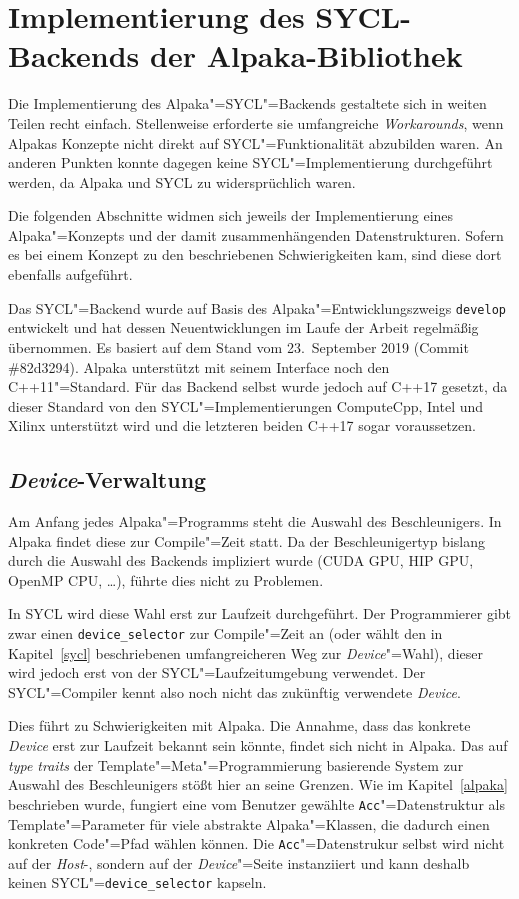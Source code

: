 \chapter{Implementierung des SYCL-Backends der Alpaka-Bibliothek}
\label{implementierung}

Die Implementierung des Alpaka"=SYCL"=Backends gestaltete sich in weiten Teilen
recht einfach. Stellenweise erforderte sie umfangreiche \textit{Workarounds},
wenn Alpakas Konzepte nicht direkt auf SYCL"=Funktionalität abzubilden waren.
An anderen Punkten konnte dagegen keine SYCL"=Implementierung durchgeführt
werden, da Alpaka und SYCL zu widersprüchlich waren.

Die folgenden Abschnitte widmen sich jeweils der Implementierung eines
Alpaka"=Konzepts und der damit zusammenhängenden Datenstrukturen. Sofern es bei
einem Konzept zu den beschriebenen Schwierigkeiten kam, sind diese dort
ebenfalls aufgeführt.

Das SYCL"=Backend wurde auf Basis des Alpaka"=Entwicklungszweigs
\texttt{develop} entwickelt und hat dessen Neuentwicklungen im Laufe der Arbeit
regelmäßig übernommen. Es basiert auf dem Stand vom 23.\ September 2019
(Commit \#82d3294). Alpaka unterstützt mit seinem Interface noch den
C++11"=Standard. Für das Backend selbst wurde jedoch auf C++17 gesetzt, da
dieser Standard von den SYCL"=Implementierungen ComputeCpp, Intel und Xilinx
unterstützt wird und die letzteren beiden C++17 sogar voraussetzen.

\section{\textit{Device}-Verwaltung}
\label{implementierung:device}

Am Anfang jedes Alpaka"=Programms steht die Auswahl des Beschleunigers. In
Alpaka findet diese zur Compile"=Zeit statt. Da der Beschleunigertyp bislang
durch die Auswahl des Backends impliziert wurde (CUDA \textrightarrow{} GPU,
HIP \textrightarrow{} GPU, OpenMP \textrightarrow{} CPU, \ldots), führte dies
nicht zu Problemen.

In SYCL wird diese Wahl erst zur Laufzeit durchgeführt. Der Programmierer gibt
zwar einen \texttt{device\_selector} zur Compile"=Zeit an (oder wählt den
in Kapitel~\ref{sycl} beschriebenen umfangreicheren Weg zur
\textit{Device}"=Wahl), dieser wird jedoch erst von der SYCL"=Laufzeitumgebung
verwendet. Der SYCL"=Compiler kennt also noch nicht das zukünftig verwendete
\textit{Device}.

Dies führt zu Schwierigkeiten mit Alpaka. Die Annahme, dass das konkrete
\textit{Device} erst zur Laufzeit bekannt sein könnte, findet sich nicht in
Alpaka. Das auf \textit{type traits} der Template"=Meta"=Programmierung
basierende System zur Auswahl des Beschleunigers stößt hier an seine Grenzen.
Wie im Kapitel~\ref{alpaka} beschrieben wurde, fungiert eine vom Benutzer
gewählte \texttt{Acc}"=Datenstruktur als Template"=Parameter für viele
abstrakte Alpaka"=Klassen, die dadurch einen konkreten Code"=Pfad wählen können.
Die \texttt{Acc}"=Datenstrukur selbst wird nicht auf der \textit{Host}-, sondern
auf der \textit{Device}"=Seite instanziiert und kann deshalb keinen
SYCL"=\texttt{device\_selector} kapseln.

